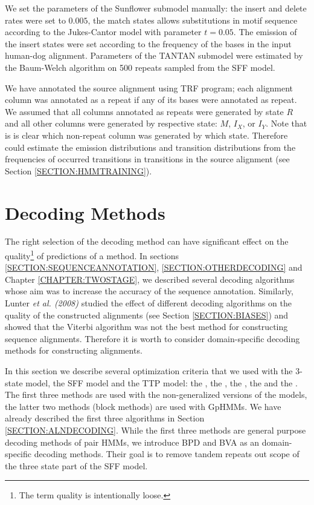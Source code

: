 We set the parameters of the Sunflower submodel manually: the insert and delete
rates were set to $0.005$, the match states allows substitutions in motif
sequence according to the Jukes-Cantor model with parameter $t=0.05$. The
emission of the insert states were set according to the frequency of the bases
in the input human-dog alignment.  Parameters of the TANTAN submodel were
estimated by the Baum-Welch algorithm \cite{Durbin1998} on 500 repeats sampled
from the SFF model.

We have annotated the source alignment using TRF program; each alignment column
was annotated as a repeat if any of its bases were annotated as repeat. We
assumed that all columns annotated as repeats were generated by state $R$ and
all other columns were generated by respective state: $M$, $I_X$, or $I_Y$.
Note that is is clear which non-repeat column was generated by which state.
Therefore could estimate the emission distributions and transition
distributions from the frequencies of occurred transitions in transitions in
the source alignment (see Section \ref{SECTION:HMMTRAINING}).

\section{Decoding Methods}\label{SECTION:REPDECODING}

The right selection of the decoding method can have significant effect on the
quality\footnote{The term quality is intentionally loose.} of predictions of a
method. In sections \ref{SECTION:SEQUENCEANNOTATION},
\ref{SECTION:OTHERDECODING} and Chapter \ref{CHAPTER:TWOSTAGE}, we described
several decoding algorithms whose aim was to increase the accuracy of the
sequence annotation. Similarly, Lunter {\it et al. (2008)} studied the effect
of different decoding algorithms on the quality of the constructed alignments
(see Section \ref{SECTION:BIASES}) and showed that the Viterbi algorithm was
not the best method for constructing sequence alignments. Therefore it is worth
to consider domain-specific decoding methods for constructing alignments.

In this section we describe several optimization criteria that we used with the
3-state model, the SFF model and the TTP model: the , the , the
, the  and the .
The first three methods are used with the non-generalized versions of the
models, the latter two methods (block methods) are used with GpHMMs. We have
already described the first three algorithms in Section
\ref{SECTION:ALNDECODING}. While the first three methods are general purpose
decoding methods of pair HMMs, we introduce BPD and BVA as an domain-specific
decoding methods. Their goal is to remove tandem repeats out scope of the three
state part of the SFF model.

